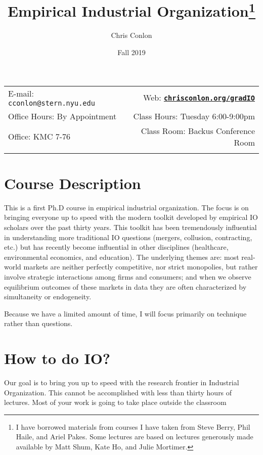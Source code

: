 \documentclass[11pt]{article}
\title{Empirical Industrial Organization\footnote{I have borrowed materials from courses I have taken from Steve Berry, Phil Haile, and Ariel Pakes. Some lectures are based on lectures generously made available by Matt Shum, Kate Ho, and Julie Mortimer.}}
\author{Chris Conlon}
\date{Fall 2019}
\newcommand{\blankline}{\quad\pagebreak[2]}
\begin{document}
\maketitle

\blankline

\begin{tabular*}{.93\textwidth}{@{\extracolsep{\fill}}lr}


  E-mail: \texttt{cconlon@stern.nyu.edu} & Web: \href{http://chrisconlon.org}{\tt\bf chrisconlon.org/gradIO}  \\

 Office Hours: By Appointment &  Class Hours: Tuesday 6:00-9:00pm \\


 Office: KMC 7-76  & Class Room: Backus Conference Room \\
&  \\
\hline
\end{tabular*}

\vspace{10 mm}

\section*{Course Description}
This is a first Ph.D course in empirical industrial organization. The focus is on bringing everyone up to speed with the modern toolkit developed by empirical IO scholars over the past thirty years. This toolkit has been tremendously influential in understanding more traditional IO questions (mergers, collusion, contracting, etc.) but has recently become influential in other disciplines (healthcare, environmental economics, and education). The underlying themes are: most real-world markets are neither perfectly competitive, nor strict monopolies, but rather involve strategic interactions among firms and consumers; and when we observe equilibrium outcomes of these markets in data they are often characterized by simultaneity or endogeneity.

Because we have a limited amount of time, I will focus primarily on technique rather than questions.

\section*{How to do IO?}
Our goal is to bring you up to speed with the research frontier in Industrial Organization. This cannot be accomplished with less than thirty hours of lectures. Most of your work is going to take place outside the classroom
\end{document}
